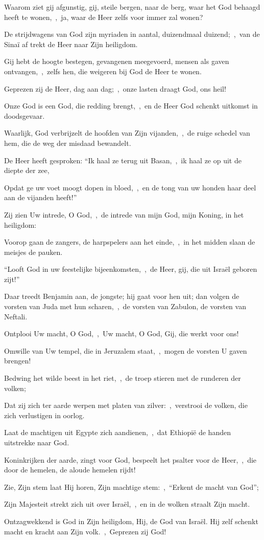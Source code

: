 \documentclass[12pt,twoside,a5paper]{article}
\begin{document}
\begin{halfparskip}
  Waarom ziet gij afgunstig, gij, steile bergen, naar de berg, waar het God behaagd heeft te wonen,~\sep\ ja, waar de Heer zelfs voor immer zal wonen?

  De strijdwagens van God zijn myriaden in aantal, duizendmaal duizend;~\sep\ van de Sinaï af trekt de Heer naar Zijn heiligdom.

  Gij hebt de hoogte bestegen, gevangenen meegevoerd, mensen als gaven ontvangen,~\sep\ zelfs hen, die weigeren bij God de Heer te wonen.

  Geprezen zij de Heer, dag aan dag;~\sep\ onze lasten draagt God, ons heil!

  Onze God is een God, die redding brengt,~\sep\ en de Heer God schenkt uitkomst in doodsgevaar.

  Waarlijk, God verbrijzelt de hoofden van Zijn vijanden,~\sep\ de ruige schedel van hem, die de weg der misdaad bewandelt.

  De Heer heeft gesproken: ``Ik haal ze terug uit Basan,~\sep\ ik haal ze op uit de diepte der zee,

  Opdat ge uw voet moogt dopen in bloed,~\sep\ en de tong van uw honden haar deel aan de vijanden heeft!''

  Zij zien Uw intrede, O God,~\sep\ de intrede van mijn God, mijn Koning, in het heiligdom:

  Voorop gaan de zangers, de harpspelers aan het einde,~\sep\ in het midden slaan de meisjes de pauken.

  ``Looft God in uw feestelijke bijeenkomsten,~\sep\ de Heer, gij, die uit Israël geboren zijt!''

  Daar treedt Benjamin aan, de jongste; hij gaat voor hen uit; dan volgen de vorsten van Juda met hun scharen,~\sep\ de vorsten van Zabulon, de vorsten van Neftali.

  Ontplooi Uw macht, O God,~\sep\ Uw macht, O God, Gij, die werkt voor ons!

  Omwille van Uw tempel, die in Jeruzalem staat,~\sep\ mogen de vorsten U gaven brengen!

  Bedwing het wilde beest in het riet,~\sep\ de troep stieren met de runderen der volken;

  Dat zij zich ter aarde werpen met platen van zilver:~\sep\ verstrooi de volken, die zich verlustigen in oorlog.

  Laat de machtigen uit Egypte zich aandienen,~\sep\ dat Ethiopië de handen uitstrekke naar God.

  Koninkrijken der aarde, zingt voor God, bespeelt het psalter voor de Heer,~\sep\ die door de hemelen, de aloude hemelen rijdt!

  Zie, Zijn stem laat Hij horen, Zijn machtige stem:~\sep\ ``Erkent de macht van God'';

  Zijn Majesteit strekt zich uit over Israël,~\sep\ en in de wolken straalt Zijn macht.

  Ontzagwekkend is God in Zijn heiligdom, Hij, de God van Israël. Hij zelf schenkt macht en kracht aan Zijn volk.~\sep\ Geprezen zij God!
\end{halfparskip}
\end{document}

